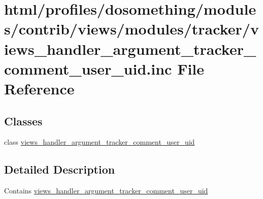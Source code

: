 \hypertarget{views__handler__argument__tracker__comment__user__uid_8inc}{
\section{html/profiles/dosomething/modules/contrib/views/modules/tracker/views\_\-handler\_\-argument\_\-tracker\_\-comment\_\-user\_\-uid.inc File Reference}
\label{views__handler__argument__tracker__comment__user__uid_8inc}
}
\subsection*{Classes}
\begin{DoxyCompactItemize}
\item 
class \hyperlink{classviews__handler__argument__tracker__comment__user__uid}{views\_\-handler\_\-argument\_\-tracker\_\-comment\_\-user\_\-uid}
\end{DoxyCompactItemize}


\subsection{Detailed Description}
Contains \hyperlink{classviews__handler__argument__tracker__comment__user__uid}{views\_\-handler\_\-argument\_\-tracker\_\-comment\_\-user\_\-uid} 